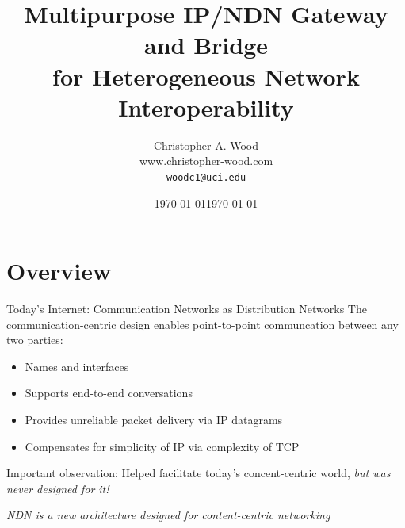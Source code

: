 \documentclass[handout]{beamer}
\title[NDN Gateway]{Multipurpose IP/NDN Gateway and Bridge \\ for Heterogeneous Network Interoperability}
\institute[Donald Bren School of Information and Computer Sciences \\ UC Irvine]{}
\date{\today}
\author[Christopher A. Wood]{Christopher A. Wood \\ \url{www.christopher-wood.com} \\ {\tt woodc1@uci.edu}}
\date{\today}
\begin{document}

\begin{frame}
	\titlepage
\end{frame}



\section{Overview}
\begin{frame}{Today's Internet: Communication Networks as Distribution Networks}
	The communication-centric design enables point-to-point communcation between any two parties:
	\begin{itemize}
		\item Names and interfaces
		\item Supports end-to-end conversations
		\item Provides unreliable packet delivery via IP datagrams
		\item Compensates for simplicity of IP via complexity of TCP
	\end{itemize}

	Important observation: Helped facilitate today's concent-centric world, \emph{but was never designed for it!}

	\medskip

	\emph{NDN is a new architecture designed for content-centric networking}
\end{frame}

\end{document}
